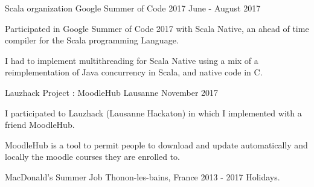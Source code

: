 


\begin{cventries}
	

\cventry
{Scala organization} %
{Google Summer of Code 2017} %
{} %
{June - August 2017} %
{ %
\begin{cvitems}
\item {Participated in Google Summer of Code 2017 with Scala Native, an ahead of time compiler for the Scala programming Language.}
\item {I had to implement multithreading for Scala Native using a mix of a reimplementation of Java concurrency in Scala, and native code in C.}
\end{cvitems}
}


\cventry
{Lauzhack Project : MoodleHub} %
{} %
{Lausanne} %
{November 2017} %
{ %
	\begin{cvitems}
		\item {I participated to Lauzhack (Lausanne Hackaton) in which I implemented with a friend MoodleHub.}
		\item {MoodleHub is a tool to permit people to download and update automatically and locally the moodle courses they are enrolled to.}
	\end{cvitems}
}


\cventry
{MacDonald's} %
{Summer Job} %
{Thonon-les-bains, France} %
{2013 - 2017 Holidays.} %
{ %
}



\end{cventries}
